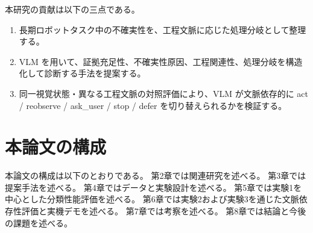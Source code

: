 本研究の貢献は以下の三点である。
\begin{enumerate}
  \item 長期ロボットタスク中の不確実性を、工程文脈に応じた処理分岐として整理する。
  \item VLM を用いて、証拠充足性、不確実性原因、工程関連性、処理分岐を構造化して診断する手法を提案する。
  \item 同一視覚状態・異なる工程文脈の対照評価により、VLM が文脈依存的に act / reobserve / ask\_user / stop / defer を切り替えられるかを検証する。
\end{enumerate}

\section{本論文の構成}

本論文の構成は以下のとおりである。
第2章では関連研究を述べる。
第3章では提案手法を述べる。
第4章ではデータと実験設計を述べる。
第5章では実験1を中心とした分類性能評価を述べる。
第6章では実験2および実験3を通じた文脈依存性評価と実機デモを述べる。
第7章では考察を述べる。
第8章では結論と今後の課題を述べる。
